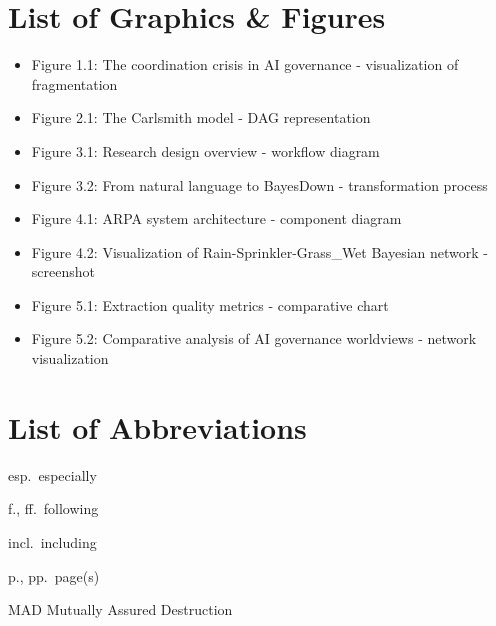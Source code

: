 \documentclass[
  11pt,
  letterpaper,
]{book}
\providecommand{\tightlist}{%
  \setlength{\itemsep}{0pt}\setlength{\parskip}{0pt}}
\begin{document}
\section*{List of Graphics \& Figures}\label{list-of-graphics-figures}


\begin{itemize}
\tightlist
\item
  Figure 1.1: The coordination crisis in AI governance - visualization
  of fragmentation\\
\item
  Figure 2.1: The Carlsmith model - DAG representation\\
\item
  Figure 3.1: Research design overview - workflow diagram\\
\item
  Figure 3.2: From natural language to BayesDown - transformation
  process\\
\item
  Figure 4.1: ARPA system architecture - component diagram\\
\item
  Figure 4.2: Visualization of Rain-Sprinkler-Grass\_Wet Bayesian
  network - screenshot\\
\item
  Figure 5.1: Extraction quality metrics - comparative chart\\
\item
  Figure 5.2: Comparative analysis of AI governance worldviews - network
  visualization
\end{itemize}

\section*{List of Abbreviations}\label{list-of-abbreviations}


esp.~especially

f., ff.~following

incl.~including

p., pp.~page(s)

MAD Mutually Assured Destruction
\end{document}
